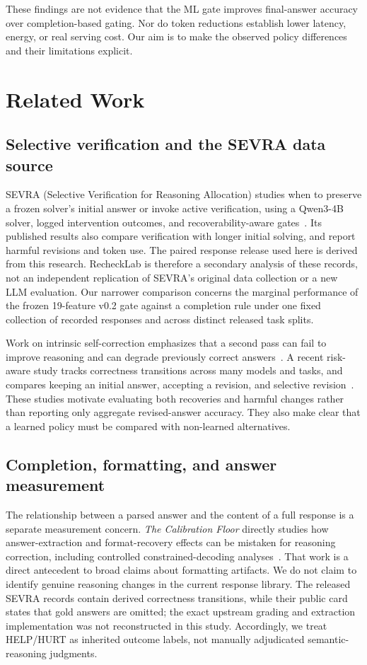 \documentclass[conference]{IEEEtran}
\begin{document}
These findings are not evidence that the ML gate improves final-answer accuracy over completion-based gating. Nor do token reductions establish lower latency, energy, or real serving cost. Our aim is to make the observed policy differences and their limitations explicit.

\section{Related Work}
\subsection{Selective verification and the SEVRA data source}
SEVRA (Selective Verification for Reasoning Allocation) studies when to preserve a frozen solver's initial answer or invoke active verification, using a Qwen3-4B solver, logged intervention outcomes, and recoverability-aware gates~\cite{dip2026sevra}. Its published results also compare verification with longer initial solving, and report harmful revisions and token use. The paired response release used here is derived from this research. RecheckLab is therefore a secondary analysis of these records, not an independent replication of SEVRA's original data collection or a new LLM evaluation. Our narrower comparison concerns the marginal performance of the frozen 19-feature v0.2 gate against a completion rule under one fixed collection of recorded responses and across distinct released task splits.

Work on intrinsic self-correction emphasizes that a second pass can fail to improve reasoning and can degrade previously correct answers~\cite{huang2024selfcorrect}. A recent risk-aware study tracks correctness transitions across many models and tasks, and compares keeping an initial answer, accepting a revision, and selective revision~\cite{zhang2026riskaware}. These studies motivate evaluating both recoveries and harmful changes rather than reporting only aggregate revised-answer accuracy. They also make clear that a learned policy must be compared with non-learned alternatives.

\subsection{Completion, formatting, and answer measurement}
The relationship between a parsed answer and the content of a full response is a separate measurement concern. \emph{The Calibration Floor} directly studies how answer-extraction and format-recovery effects can be mistaken for reasoning correction, including controlled constrained-decoding analyses~\cite{chen2026calibration}. That work is a direct antecedent to broad claims about formatting artifacts. We do not claim to identify genuine reasoning changes in the current response library. The released SEVRA records contain derived correctness transitions, while their public card states that gold answers are omitted; the exact upstream grading and extraction implementation was not reconstructed in this study. Accordingly, we treat HELP/HURT as inherited outcome labels, not manually adjudicated semantic-reasoning judgments.
\end{document}
